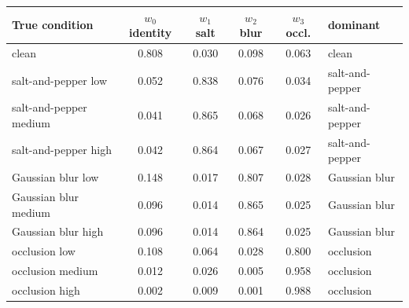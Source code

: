 \begin{tabular}{lcccc l}
\toprule
True condition & $w_0$ identity & $w_1$ salt & $w_2$ blur & $w_3$ occl. & dominant \\
\midrule
clean  & 0.808 & 0.030 & 0.098 & 0.063 & clean \\
salt-and-pepper low & 0.052 & 0.838 & 0.076 & 0.034 & salt-and-pepper \\
salt-and-pepper medium & 0.041 & 0.865 & 0.068 & 0.026 & salt-and-pepper \\
salt-and-pepper high & 0.042 & 0.864 & 0.067 & 0.027 & salt-and-pepper \\
Gaussian blur low & 0.148 & 0.017 & 0.807 & 0.028 & Gaussian blur \\
Gaussian blur medium & 0.096 & 0.014 & 0.865 & 0.025 & Gaussian blur \\
Gaussian blur high & 0.096 & 0.014 & 0.864 & 0.025 & Gaussian blur \\
occlusion low & 0.108 & 0.064 & 0.028 & 0.800 & occlusion \\
occlusion medium & 0.012 & 0.026 & 0.005 & 0.958 & occlusion \\
occlusion high & 0.002 & 0.009 & 0.001 & 0.988 & occlusion \\
\bottomrule
\end{tabular}
